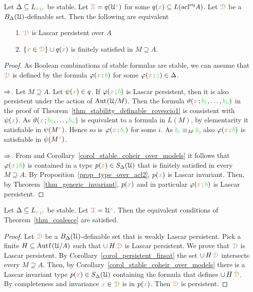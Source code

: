 \begin{corollary}\label{corol_persistent_finsat}
  Let $\Delta\subseteq L_{{\color{brown} x}\,;{\color{green} z}}$ be stable.
  Let ${\color{brown}\EuScript X}= q(\EuScript U^{\color{brown} x})$ for some $q({\color{brown} x})\subseteq L(\mathop{\rm acl}^{{\rm eq}}\!A)$.
  Let ${\color{brown}\EuScript D}$ be a $B_\Delta(\EuScript U)$-definable set.
  Then the following are equivalent 
  \begin{itemize}
    \item[1.] ${\color{brown}\EuScript D}$ is Lascar persistent over $A$
    \item[2.] $\{{\color{brown} x}\in{\color{brown}\EuScript D}\}\cup q({\color{brown} x})$ is finitely satisfied in $M\supseteq A$.
  \end{itemize}
\end{corollary}
\begin{proof}
  As Boolean combinations of stable formulas are stable, we can assume that ${\color{brown}\EuScript D}$ is defined by the formula $\varphi({\color{brown} x}\,;{\color{green} b})$ for some $\varphi({\color{brown} x}\,;{\color{green} z})\in\Delta$.

  $\Rightarrow$.
  Let $M\supseteq A$.
  Let $\psi({\color{brown} x})\in q$.
  If $\varphi({\color{brown} x}\,;{\color{green} b})$ is Lascar persistent, then it is also persistent under the action of ${\rm Aut\kern.15ex}(\EuScript U/M)$.
  Then the formula $\vartheta({\color{brown} x}\,;{\color{green} b_1},\dots,{\color{green} b_n})$ in the proof of Theorem~\ref{thm_stability_definable_rovescio1} is consistent with $\psi({\color{brown} x})$.
  As $\vartheta({\color{brown} x}\,;{\color{green} b_1},\dots,{\color{green} b_n})$ is equivalent to a formula in $L(M)$, by elementarity it satisfiable in $\psi(M^{\color{brown} x})$.
  Hence so is $\varphi({\color{brown} x}\,;{\color{green} b_i})$ for some $i$.
  As ${\color{green} b_i}\equiv_M{\color{green} b}$, also $\varphi({\color{brown} x}\,;{\color{green} b})$ is satisfiable in $\psi(M^{\color{brown} x})$.
  
  $\Rightarrow$.
  From  and Corollary~\ref{corol_stable_coheir_over_models} it follows that $\varphi({\color{brown} x}\,;{\color{green} b})$ is contained in a type $p({\color{brown} x})\in S_\Delta(\EuScript U)$ that is finitely satisfied in every $M\supseteq A$.
  By Proposition~\ref{prop_type_over_acl2}, $p({\color{brown} x})$ is Lascar invariant.
  Then, by Theorem~\ref{thm_generic_invariant}, $p({\color{brown} x})$ and in particular $\varphi({\color{brown} x}\,;{\color{green} b})$ is Lascar persistent.
\end{proof}

\begin{proposition}
  Let $\Delta\subseteq L_{{\color{brown} x}\,;{\color{green} z}}$ be stable.
  Let ${\color{brown}\EuScript X}=\EuScript U^{\color{brown} x}$.
  Then the equivalent conditions of Theorem~\ref{thm_coalesce} are satisfied.
\end{proposition}

\begin{proof}
  Let ${\color{brown}\EuScript D}$ be a $B_\Delta(\EuScript U)$-definable set that is weakly Lascar persistent.
  Pick a finite $H\subseteq\mathord{\rm Aut\kern.15ex{f}\kern.15ex}(\EuScript U/A)$ such that $\cup\,H\,{\color{brown}\EuScript D}$ is Lascar persistent.
  We prove that ${\color{brown}\EuScript D}$ is Lascar persistent.
  By Corollary~\ref{corol_persistent_finsat} the set $\cup\,H\,{\color{brown}\EuScript D}$ intersects every $M\supseteq A$.
  Then, by Corollary~\ref{corol_stable_coheir_over_models} there is a Lascar invariant type $p({\color{brown} x})\in S_\Delta(\EuScript U)$ containing the formula that defines $\cup\,H\,{\color{brown}\EuScript D}$.
  By completeness and invariance ${\color{brown} x}\in{\color{brown}\EuScript D}$ is in $p({\color{brown} x})$.
  Then ${\color{brown}\EuScript D}$ is persistent.
\end{proof}

